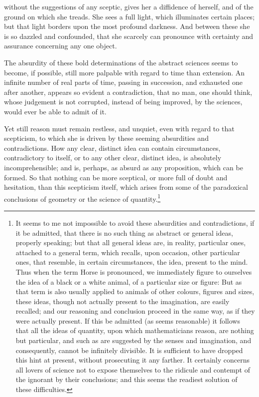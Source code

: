 \documentclass[]{article}
\newcounter{authornote}[page]
\newcommand*{\authornote}[1]{\renewcommand{\thefootnote}{\fnsymbol{footnote}}\stepcounter{authornote}\footnote[\value{authornote}]{#1}\renewcommand{\thefootnote}{\arabic{footnote}}}
\begin{document}
\begin{sectionbody}
without the suggestions of any sceptic, gives her a diffidence of herself, and of the ground on which she treads. She sees a full light, which illuminates certain places; but that light borders upon the most profound darkness. And between these she is so dazzled and confounded, that she scarcely can pronounce with certainty and assurance concerning any one object.

\humeparagraph  The absurdity of these bold determinations of the abstract sciences seems to become, if possible, still more palpable with regard to time than extension. An infinite number of real parts of time, passing in succession, and exhausted one after another, appears so evident a contradiction, that no man, one should think, whose judgement is not corrupted, instead of being improved, by the sciences, would ever be able to admit of it.

\humeparagraph  Yet still reason must remain restless, and unquiet, even with regard to that scepticism, to which she is driven by these seeming absurdities and contradictions. How any clear, distinct idea can contain circumstances, contradictory to itself, or to any other clear, distinct idea, is absolutely incomprehensible; and is, perhaps, as absurd as any proposition, which can be formed. So that nothing can be more sceptical, or more full of doubt and hesitation, than this scepticism itself, which arises from some of the paradoxical conclusions of geometry or the science of quantity.\authornote{It seems to me not impossible to avoid these absurdities and contradictions, if it be admitted, that there is no such thing as abstract or general ideas, properly speaking; but that all general ideas are, in reality, particular ones, attached to a general term, which recalls, upon occasion, other particular ones, that resemble, in certain circumstances, the idea, present to the mind. Thus when the term Horse is pronounced, we immediately figure to ourselves the idea of a black or a white animal, of a particular size or figure: But as that term is also usually applied to animals of other colours, figures and sizes, these ideas, though not actually present to the imagination, are easily recalled; and our reasoning and conclusion proceed in the same way, as if they were actually present. If this be admitted (as seems reasonable) it follows that all the ideas of quantity, upon which mathematicians reason, are nothing but particular, and such as are suggested by the senses and imagination, and consequently, cannot be infinitely divisible. It is sufficient to have dropped this hint at present, without prosecuting it any farther. It certainly concerns all lovers of science not to expose themselves to the ridicule and contempt of the ignorant by their conclusions; and this seems the readiest solution of these difficulties.}


\end{sectionbody}
\end{document}
